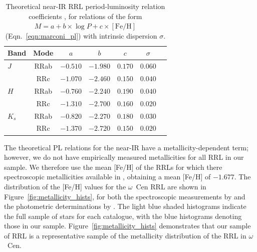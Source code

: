 \documentclass[a4paper,fleqn,usenatbib]{mnras}
\begin{document}
\begin{table}
\centering
\caption{Theoretical near-IR RRL period-luminosity relation coefficients \citep{2015ApJ...808...50M}, for relations of the form ${M = a + b \times \log P + c \times [\text{Fe/H}]}$ (Eqn.~\ref{eqn:marconi_pl}) with intrinsic dispersion $\sigma$.}
\label{tab:pl_table_theo}
\begin{tabular}{l||c|c|c|c|c|r} 
\hline \hline
Band & Mode & $a$   & $b$   & $c$   & $\sigma$ \\
\hline
$J$ & RRab & $-0.510$ & $-1.980$ & $0.170$ & $0.060$ \\
       & RRc & $-1.070$ & $-2.460$ & $0.150$ & $0.040$ \\
$H$ & RRab & $-0.760$ & $-2.240$ & $0.190$ & $0.040$\\
       & RRc & $-1.310$ & $-2.700$ & $0.160$ & $0.020$\\
$K_s$ & RRab & $-0.820$ & $-2.270$ & $0.180$ & $0.030$\\
           & RRc & $-1.370$ & $-2.720$ & $0.150$ & $0.020$ \\       
\hline
\end{tabular}
\end{table}

The theoretical PL relations for the near-IR have a metallicity-dependent term; however, we do not have empirically measured metallicities for all RRL in our sample. We therefore use the mean [Fe/H] of the RRLs for which there spectroscopic metallicities available in \citet{2006ApJ...640L..43S}, obtaining a mean [Fe/H] of $-1.677$. The distribution of the [Fe/H] values for the $\omega$~Cen RRL are shown in Figure~\ref{fig:metallicity_hists}, for both the spectroscopic measurements by \citet{2006ApJ...640L..43S} and the photometric determinations by \citet{2000AJ....119.1824R}. The light blue shaded histograms indicate the full sample of stars for each catalogue, with the blue histograms denoting those in our sample. Figure~\ref{fig:metallicity_hists} demonstrates that our sample of RRL is a representative sample of the metallicity distribution of the RRL in $\omega$~Cen. 
\end{document}

